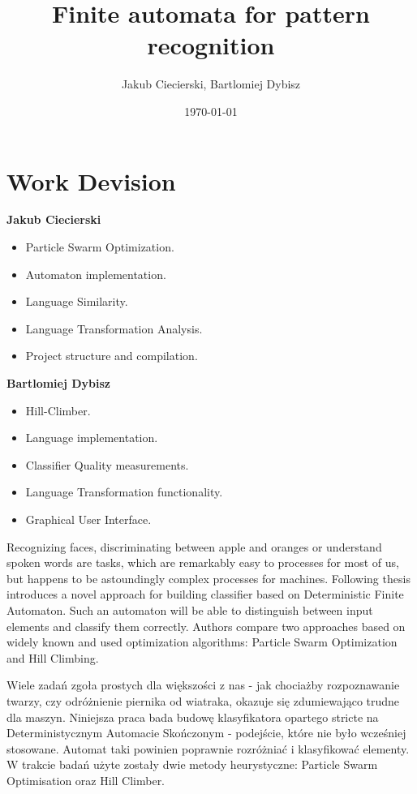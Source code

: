 \documentclass{mini}
\title{Finite automata for pattern recognition}
\author{Jakub Ciecierski, Bartlomiej Dybisz}
\date{\today}
\begin{document}
\maketitle
\tableofcontents



\chapter*{Work Devision}

{\bf Jakub Ciecierski}
\begin{itemize}
    \item Particle Swarm Optimization.
    \item Automaton implementation.
    \item Language Similarity.
    \item Language Transformation Analysis.
    \item Project structure and compilation.
\end{itemize}

{\bf Bartlomiej Dybisz}
\begin{itemize}
    \item Hill-Climber.
    \item Language implementation.
    \item Classifier Quality measurements.
    \item Language Transformation functionality.
    \item Graphical User Interface.
\end{itemize}


\abstract
Recognizing faces, discriminating between apple and oranges or understand spoken words are tasks, which are remarkably easy to processes for most of us, but happens to be astoundingly complex processes for machines. Following thesis introduces a novel approach for building classifier based on  Deterministic Finite Automaton. Such an automaton will be able to distinguish between input elements and classify them correctly. Authors compare two approaches based on widely known and used optimization algorithms: Particle Swarm Optimization and Hill Climbing.

\abstract
Wiele zadań zgoła prostych dla większości z nas - jak chociażby rozpoznawanie twarzy, czy odróżnienie piernika od wiatraka, okazuje się zdumiewająco trudne dla maszyn. Niniejsza praca bada budowę klasyfikatora opartego stricte na Deterministycznym Automacie Skończonym - podejście, które nie było wcześniej stosowane. Automat taki powinien poprawnie rozróżniać i klasyfikować elementy. W trakcie badań użyte zostały dwie metody heurystyczne: Particle Swarm Optimisation oraz Hill Climber.
\end{document}
